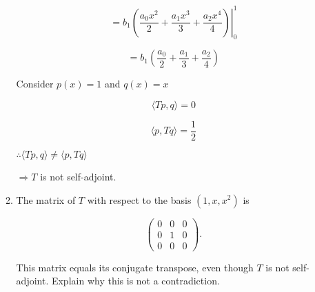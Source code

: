 \documentclass[fleqn]{article}
\makeatletter
\newenvironment{equationCenter}{\@fleqnfalse\begin{equation*}}{\end{equation*}}
\makeatother
\begin{document}
\begin{enumerate}[nolistsep]
\begin{enumerate}[nolistsep]
			\begin{equation*}
				= b_1\left.\left(\frac{a_0x^2}{2} + \frac{a_1x^3}{3} + \frac{a_2x^4}{4}\right)\right\vert_{0}^{1}
			\end{equation*}
			
			\begin{equation*}
				= b_1\left(\frac{a_0}{2} + \frac{a_1}{3} + \frac{a_2}{4}\right)
			\end{equation*}
			
			Consider $p(x) = 1$ and $q(x) = x$
			
			\begin{equation*}
				\langle Tp, q \rangle = 0
			\end{equation*}
			
			\begin{equation*}
				\langle p, Tq \rangle = \frac{1}{2}
			\end{equation*}
			
			$\therefore \langle Tp, q \rangle \neq \langle p, Tq \rangle$
			
			$\Rightarrow T$ is not self-adjoint.
			
			\item The matrix of $T$ with respect to the basis $(1,x,x^2)$ is
			
			\begin{equationCenter}
				\begin{pmatrix}
					0 & 0 & 0\\
					0 & 1 & 0\\
					0 & 0 & 0
				\end{pmatrix}.
			\end{equationCenter}
			
			This matrix equals its conjugate transpose, even though $T$ is not self-adjoint. Explain why this is not a contradiction.
			
		\end{enumerate}
	\end{enumerate}
\end{document}

